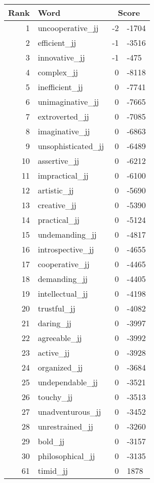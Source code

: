 \begin{longtable}[!htbp]{| rlr@{.}l |}
    \hline
    \textbf{Rank} & \textbf{Word} & \multicolumn{2}{c|}{\textbf{Score}} \\
    \hline
    \endhead
    1 & uncooperative\_jj & -2 & -1704 \\
    2 & efficient\_jj & -1 & -3516 \\
    3 & innovative\_jj & -1 & -475 \\
    4 & complex\_jj & 0 & -8118 \\
    5 & inefficient\_jj & 0 & -7741 \\
    6 & unimaginative\_jj & 0 & -7665 \\
    7 & extroverted\_jj & 0 & -7085 \\
    8 & imaginative\_jj & 0 & -6863 \\
    9 & unsophisticated\_jj & 0 & -6489 \\
    10 & assertive\_jj & 0 & -6212 \\
    11 & impractical\_jj & 0 & -6100 \\
    12 & artistic\_jj & 0 & -5690 \\
    13 & creative\_jj & 0 & -5390 \\
    14 & practical\_jj & 0 & -5124 \\
    15 & undemanding\_jj & 0 & -4817 \\
    16 & introspective\_jj & 0 & -4655 \\
    17 & cooperative\_jj & 0 & -4465 \\
    18 & demanding\_jj & 0 & -4405 \\
    19 & intellectual\_jj & 0 & -4198 \\
    20 & trustful\_jj & 0 & -4082 \\
    21 & daring\_jj & 0 & -3997 \\
    22 & agreeable\_jj & 0 & -3992 \\
    23 & active\_jj & 0 & -3928 \\
    24 & organized\_jj & 0 & -3684 \\
    25 & undependable\_jj & 0 & -3521 \\
    26 & touchy\_jj & 0 & -3513 \\
    27 & unadventurous\_jj & 0 & -3452 \\
    28 & unrestrained\_jj & 0 & -3260 \\
    29 & bold\_jj & 0 & -3157 \\
    30 & philosophical\_jj & 0 & -3135 \\
    61 & timid\_jj & 0 & 1878 \\

\end{longtable}
